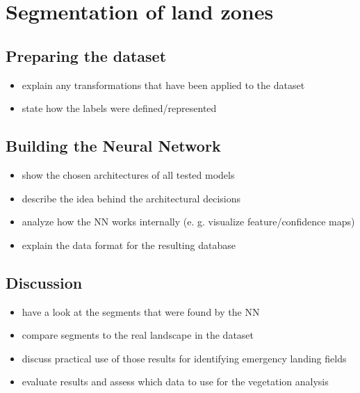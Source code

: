 \section{Segmentation of land zones}

\subsection{Preparing the dataset}
\begin{itemize}
    \item explain any transformations that have been applied to the dataset
    \item state how the labels were defined/represented
\end{itemize}

\subsection{Building the Neural Network}
\begin{itemize}
    \item show the chosen architectures of all tested models
    \item describe the idea behind the architectural decisions
    \item analyze how the NN works internally (e. g. visualize feature/confidence maps)
    \item explain the data format for the resulting database
\end{itemize}

\subsection{Discussion}
\begin{itemize}
    \item have a look at the segments that were found by the NN
    \item compare segments to the real landscape in the dataset
    \item discuss practical use of those results for identifying emergency landing fields
    \item evaluate results and assess which data to use for the vegetation analysis
\end{itemize}

\newpage
